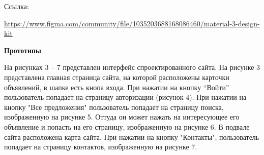 Ссылка:

\url{https://www.figma.com/community/file/1035203688168086460/material-3-design-kit}
\bigskip

\textbf{Прототипы}
\bigskip

На рисунках 3 – 7 представлен интерфейс спроектированного сайта. 
На  рисунке  3  представлена  главная  страница  сайта,  на  которой 
расположены карточки объявлений, в шапке есть кнопа входа.
При  нажатии  на  кнопку  “Войти”  пользователь  попадает  на  страницу 
авторизации (рисунок 4).
При нажатии на кнопку "Все предложения" пользователь попадает на страницу поиска, изображенную на рисунке 5.
Оттуда он может нажать на интересующее его объявление и попасть на его страницу, изображенную на рисунке 6.
В подвале сайта расположена карта сайта. При нажатии на кнопку "Контакты", пользователь попадает на страницу контактов, изображенную на рисунке 7.
\bigskip

\noindent
\begin{minipage}{\linewidth}
\end{minipage}
\bigskip

